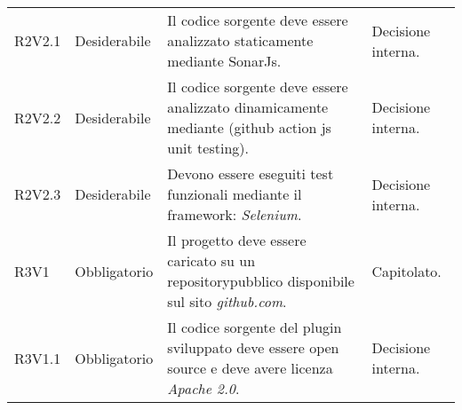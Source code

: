 \begin{longtable} {
		>{\centering}p{18mm} 
		>{\centering}p{28mm}
		>{}p{50mm} 
		>{}p{28mm}
		}
	R2V2.1 &
	Desiderabile &
	Il codice sorgente deve essere analizzato staticamente mediante SonarJs\glo . &
	Decisione interna.  \TBstrut \\ [2mm]
	
	R2V2.2 &
	Desiderabile &
	Il codice sorgente deve essere analizzato dinamicamente mediante (github action js unit testing). &
	Decisione interna.  \TBstrut \\ [2mm]
	
	R2V2.3 &
	Desiderabile &
	Devono essere eseguiti test funzionali mediante il framework: \textit{Selenium}. &
	Decisione interna.  \TBstrut \\ [2mm]
	
	R3V1 & 
	Obbligatorio & 
	Il progetto deve essere caricato su un repository\glosp pubblico disponibile sul sito \textit{github.com}. &
	Capitolato.  \TBstrut \\ [2mm]
	
	R3V1.1 & 
	Obbligatorio & 
	Il codice sorgente del plugin sviluppato deve essere open source e deve avere licenza \textit{Apache 2.0}.  &
	Decisione interna.  \TBstrut \\ [2mm]
\end{longtable}